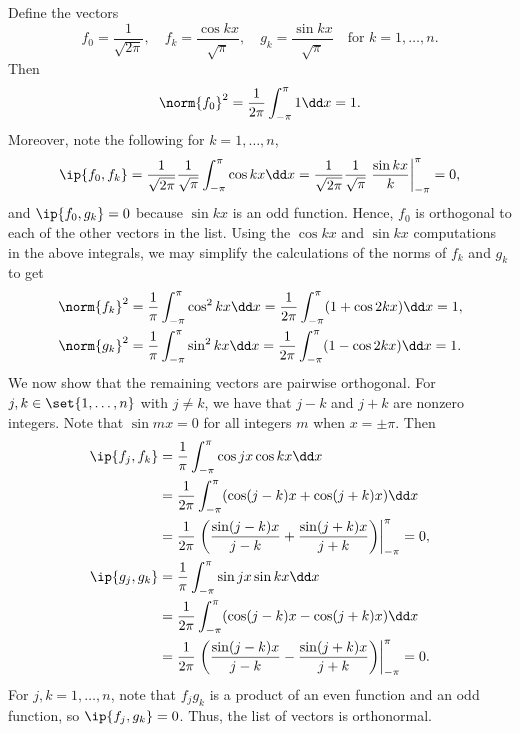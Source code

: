 \begin{sol}
    Define the vectors
    \[
        f_0 = \frac{1}{\sqrt{2\pi}}, \quad f_k = \frac{\cos kx}{\sqrt{\pi}}, \quad g_k = \frac{\sin kx}{\sqrt{\pi}} \quad \text{for } k = 1, \ldots, n.
    \]
    Then
    \[
        \norm{f_0}^2 = \frac{1}{2\pi}\int_{-\pi}^{\pi} 1 \dd x = 1.
    \]
    Moreover, note the following for $k = 1, \ldots, n$,
    \[
        \ip{f_0, f_k} = \frac{1}{\sqrt{2\pi}}\frac{1}{\sqrt{\pi}}\int_{-\pi}^{\pi} \cos kx \dd x = \frac{1}{\sqrt{2\pi}}\frac{1}{\sqrt{\pi}}\left.\frac{\sin kx}{k}\right|_{-\pi}^{\pi} = 0,
    \]
    and $\ip{f_0, g_k} = 0$ because $\sin kx$ is an odd function.
    Hence, $f_0$ is orthogonal to each of the other vectors in the list.
    Using the $\cos kx$ and $\sin kx$ computations in the above integrals, we may simplify the calculations of the norms of $f_k$ and $g_k$ to get
    \begin{align*}
        \norm{f_k}^2 &= \frac{1}{\pi}\int_{-\pi}^{\pi} \cos^2 kx \dd x = \frac{1}{2\pi}\int_{-\pi}^{\pi} (1 + \cos 2kx) \dd x = 1, \\
        \norm{g_k}^2 &= \frac{1}{\pi}\int_{-\pi}^{\pi} \sin^2 kx \dd x = \frac{1}{2\pi}\int_{-\pi}^{\pi} (1 - \cos 2kx) \dd x = 1.
    \end{align*}
    We now show that the remaining vectors are pairwise orthogonal.
    For $j, k \in \set{1, \ldots, n}$ with $j \neq k$, we have that $j - k$ and $j + k$ are nonzero integers.
    Note that $\sin mx = 0$ for all integers $m$ when $x = \pm \pi$.
    Then
    \begin{align*}
        \ip{f_j, f_k} &= \frac{1}{\pi}\int_{-\pi}^{\pi} \cos jx \cos kx \dd x \\
        &= \frac{1}{2\pi}\int_{-\pi}^{\pi} (\cos(j - k)x + \cos(j + k)x) \dd x \\
        &= \frac{1}{2\pi}\left.\left(\frac{\sin(j - k)x}{j - k} + \frac{\sin(j + k)x}{j + k}\right)\right|_{-\pi}^{\pi} = 0, \\
        \ip{g_j, g_k} &= \frac{1}{\pi}\int_{-\pi}^{\pi} \sin jx \sin kx \dd x \\
        &= \frac{1}{2\pi}\int_{-\pi}^{\pi} (\cos(j - k)x - \cos(j + k)x) \dd x \\
        &= \frac{1}{2\pi}\left.\left(\frac{\sin(j - k)x}{j - k} - \frac{\sin(j + k)x}{j + k}\right)\right|_{-\pi}^{\pi} = 0.
    \end{align*}
    For $j, k = 1, \ldots, n$, note that $f_j g_k$ is a product of an even function and an odd function, so $\ip{f_j, g_k} = 0$.
    Thus, the list of vectors is orthonormal.
\end{sol}


